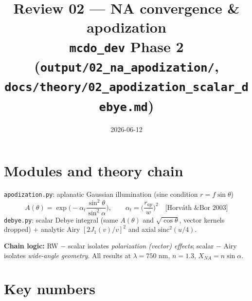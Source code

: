 \documentclass[10pt]{article}
\title{\vspace{-1.2cm}\textbf{Review 02 --- NA convergence \& apodization}\\
\large \texttt{mcdo\_dev} Phase 2 \quad(\texttt{output/02\_na\_apodization/},
\texttt{docs/theory/02\_apodization\_scalar\_debye.md})}
\author{}
\date{2026-06-12}
\begin{document}
\maketitle
\vspace{-1.1cm}

\section*{Modules and theory chain}

\texttt{apodization.py}: aplanatic Gaussian illumination (sine condition
$r=f\sin\theta$)
$$A(\theta)=\exp\!\Big(-\alpha_t\frac{\sin^2\theta}{\sin^2\alpha}\Big),\qquad
\alpha_t=\Big(\frac{r_{ap}}{w}\Big)^2 \quad \text{[Horv\'ath \& Bor 2003]}$$
\texttt{debye.py}: scalar Debye integral (same $A(\theta)$ and
$\sqrt{\cos\theta}$, vector kernels dropped) + analytic Airy
$[2J_1(v)/v]^2$ and axial $\mathrm{sinc}^2(u/4)$.

\textbf{Chain logic:} RW $-$ scalar isolates \emph{polarization (vector)
effects}; scalar $-$ Airy isolates \emph{wide-angle geometry}. All results at
$\lambda=750$ nm, $n=1.3$, $X_{NA}=n\sin\alpha$.

\section*{Key numbers}
\end{document}
